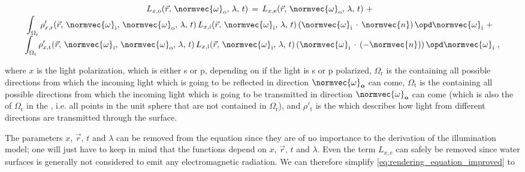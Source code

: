 \begin{equation} \label{eq:rendering_equation_improved}
\renewcommand*{\arraystretch}{1.5}
\begin{array}{cl}
L_{x,\text{o}}(\vec{r},\,\normvec{\omega}_{\text{o}},\, \lambda,\, t) \,=\, L_{x,\text{e}}(\vec{r},\, \normvec{\omega}_{\text{o}},\, \lambda,\, t) \ + \\
\displaystyle \int_{\Omega_{\text{r}}} \rho'_{x,\text{r}}(\vec{r},\, \normvec{\omega}_{\text{i}},\, \normvec{\omega}_{\text{o}},\, \lambda,\, t)\, L_{x,\text{i}}(\vec{r},\, \normvec{\omega}_{\text{i}},\, \lambda,\, t)\, (\normvec{\omega}_{\text{i}}\,\cdot\,\normvec{n})\, \opd \normvec{\omega}_{\text{i}} \ + \\
\displaystyle \int_{\Omega_{\text{t}}} \rho'_{x,\text{t}}(\vec{r},\, \normvec{\omega}_{\text{i}},\, \normvec{\omega}_{\text{o}},\, \lambda,\, t)\, L_{x,\text{i}}(\vec{r},\, \normvec{\omega}_{\text{i}},\, \lambda,\, t)\, (\normvec{\omega}_{\text{i}}\,\cdot\,(-\normvec{n}))\, \opd \normvec{\omega}_{\text{i}} & \!\!\!\! ,
\end{array}
\end{equation}

where $x$ is the light polarization, which is either s or p, depending on if the light is s or p polarized, $\Omega_{\text{r}}$ is the  containing all possible directions from which the incoming light which is going to be reflected in direction $\normvec{\omega}_{\textbf{o}}$ can come, $\Omega_{\text{t}}$ is the  containing all possible directions from which the incoming light which is going to be transmitted in direction $\normvec{\omega}_{\textbf{o}}$ can come (which is also the  of $\Omega_{\text{r}}$ in the , i.e. all points in the unit sphere that are not contained in $\Omega_{\text{r}}$), and $\rho'_{\text{t}}$ is the \BTDF which describes how light from different directions are transmitted through the surface.

The parameters $x$, $\vec{r}$, $t$ and $\lambda$ can be removed from the equation since they are of no importance to the derivation of the illumination model; one will just have to keep in mind that the functions depend on $x$, $\vec{r}$, $t$ and $\lambda$. Even the term $L_{x, \text{e}}$ can safely be removed since water surfaces is generally not considered to emit any electromagnetic radiation. We can therefore simplify \eqref{eq:rendering_equation_improved} to

